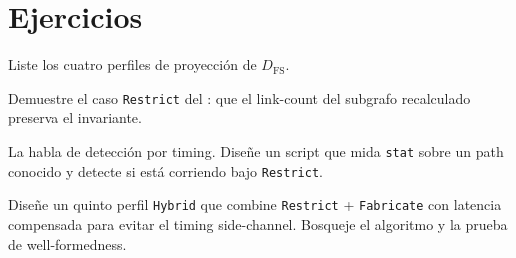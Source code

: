 \section*{Ejercicios}

\begin{ejercicio}[\dificultad{$\star$}]
\label{ej:dec-1}
Liste los cuatro perfiles de proyección de $D_{\mathrm{FS}}$.
\end{ejercicio}

\begin{ejercicio}[\dificultad{$\star\star$}]
\label{ej:dec-2}
Demuestre el caso \texttt{Restrict} del :
que el link-count del subgrafo recalculado preserva el invariante.
\end{ejercicio}

\begin{ejercicio}[\dificultad{$\star\star$}]
\label{ej:dec-3}
La  habla de detección por timing.
Diseñe un script que mida \texttt{stat} sobre un path conocido y
detecte si está corriendo bajo \texttt{Restrict}.
\end{ejercicio}

\begin{ejercicio}[\dificultad{$\star\star\star$}]
\label{ej:dec-4}
Diseñe un quinto perfil \texttt{Hybrid} que combine \texttt{Restrict}
+ \texttt{Fabricate} con latencia compensada para evitar el timing
side-channel. Bosqueje el algoritmo y la prueba de well-formedness.
\end{ejercicio}
